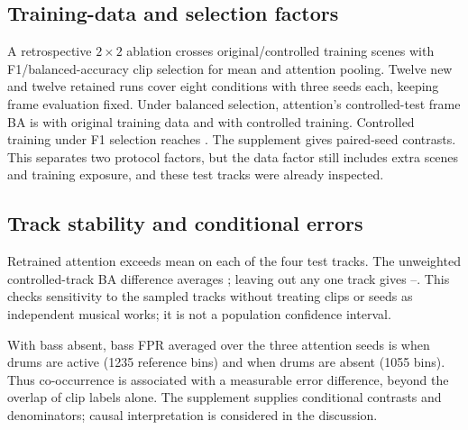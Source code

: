 \subsection{Training-data and selection factors}
A retrospective $2\times2$ ablation crosses original/controlled training scenes with F1/balanced-accuracy clip selection for mean and attention pooling. Twelve new and twelve retained runs cover eight conditions with three seeds each, keeping frame evaluation fixed. Under balanced selection, attention's controlled-test frame BA is \OriginalAttentionBA{} with original training data and \ControlledAttentionBABA{} with controlled training. Controlled training under F1 selection reaches \ControlledAttentionFoneBA{}. The supplement gives paired-seed contrasts. This separates two protocol factors, but the data factor still includes extra scenes and training exposure, and these test tracks were already inspected.

\subsection{Track stability and conditional errors}
Retrained attention exceeds mean on each of the four test tracks. The unweighted controlled-track BA difference averages \TrackDelta{}; leaving out any one track gives \TrackLooLow{}--\TrackLooHigh{}. This checks sensitivity to the sampled tracks without treating clips or seeds as independent musical works; it is not a population confidence interval.

With bass absent, bass FPR averaged over the three attention seeds is \BassFprDrumsOn{} when drums are active (1235 reference bins) and \BassFprDrumsOff{} when drums are absent (1055 bins). Thus co-occurrence is associated with a measurable error difference, beyond the overlap of clip labels alone. The supplement supplies conditional contrasts and denominators; causal interpretation is considered in the discussion.
